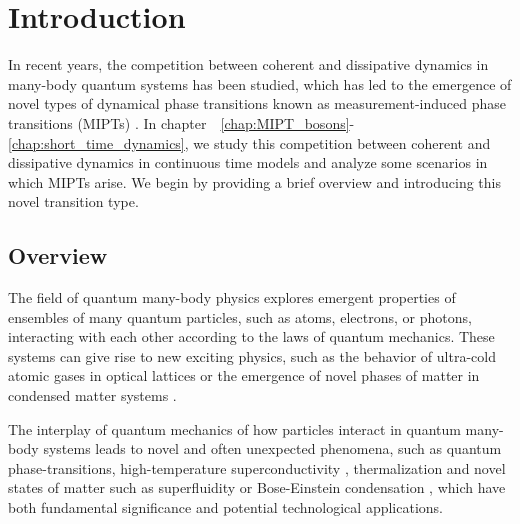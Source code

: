 \chapter{Introduction}
\thispagestyle{empty}
\label{chap:intro}
    
    \pagestyle{fancy}
    \renewcommand{\chaptermark}[1]{ \markboth{#1}{} }
    \renewcommand{\sectionmark}[1]{ \markright{#1}{} }
    \fancyhead{}
    \fancyhead[R]{\leftmark}
    \fancyhead[R]{\rightmark}
    \fancyfoot{}
    \renewcommand{\footrulewidth}{0.4pt}
    \fancyfoot[R]{\thepage}

In recent years, the competition between coherent and dissipative dynamics in many-body quantum systems has been studied, which has led to the emergence of novel types of dynamical phase transitions known as measurement-induced phase transitions (MIPTs) \cite{li2018,li2019,chen2020,skinner2019,bao2020,jian2020,zabalo2020,zhang2020,gullans2020,bentsen2021a}.  In chapter~~\ref{chap:MIPT_bosons}-\ref{chap:short_time_dynamics}, we study this competition between coherent and dissipative dynamics in continuous time models and analyze some scenarios in which MIPTs arise. We begin by providing a brief overview and introducing this novel transition type.

\section{Overview}

The field of quantum many-body physics explores emergent properties of ensembles of many quantum particles, such as atoms, electrons, or photons, interacting with each other according to the laws of quantum mechanics. These systems can give rise to new exciting physics, such as the behavior of ultra-cold atomic gases in optical lattices \cite{bloch2012} or the emergence of novel phases of matter in condensed matter systems \cite{bernevig2013}.

The interplay of quantum mechanics of how particles interact in quantum many-body systems leads to novel and often unexpected phenomena, such as quantum phase-transitions, high-temperature superconductivity \cite{leggett2006}, thermalization \cite{srednicki1994} and novel states of matter such as superfluidity \cite{schmitt2015} or Bose-Einstein condensation \cite{georgescu2020}, which have both fundamental significance and potential technological applications.

